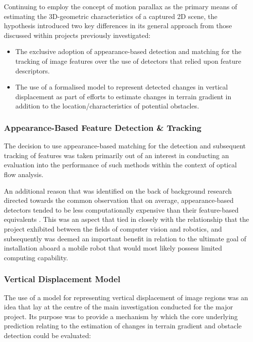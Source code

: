 Continuing to employ the concept of motion parallax as the primary means of estimating the 3D-geometric characteristics of a captured 2D scene, the hypothesis introduced two key differences in its general approach from those discussed within projects previously investigated:

\begin{itemize}
	\item The exclusive adoption of appearance-based detection and matching for the tracking of image features over the use of detectors that relied upon feature descriptors.
	\item The use of a formalised model to represent detected changes in vertical displacement as part of efforts to estimate changes in terrain gradient in addition to the location/characteristics of potential obstacles. 
\end{itemize}

\subsubsection{Appearance-Based Feature Detection \& Tracking}

The decision to use appearance-based matching for the detection and subsequent tracking of features was taken primarily out of an interest in conducting an evaluation into the performance of such methods within the context of optical flow analysis. 

An additional reason that was identified on the back of background research \cite{} \cite{} directed towards the common observation that on average, appearance-based detectors tended to be less computationally expensive than their feature-based equivalents \cite{}. This was an aspect that tied in closely with the relationship that the project exhibited between the fields of computer vision and robotics, and subsequently was deemed an important benefit in relation to the ultimate goal of installation aboard a mobile robot that would most likely possess limited computing capability.

\subsubsection{Vertical Displacement Model}

The use of a model for representing vertical displacement of image regions was an idea that lay at the centre of the main investigation conducted for the major project. Its purpose was to provide a mechanism by which the core underlying prediction relating to the estimation of changes in terrain gradient and obstacle detection could be evaluated:
	
